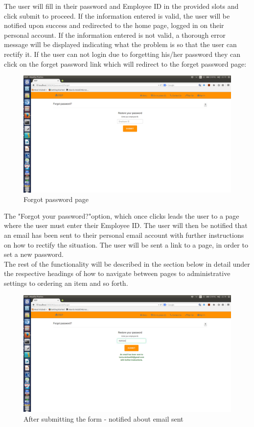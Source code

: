 \documentclass[a4paper,12pt]{report}
\begin{document}
The user will fill in their password and Employee ID in the provided slots and click submit to proceed. If the information entered is valid, the user will be notified upon success and redirected to the home page, logged in on their personal account. If the information entered is not valid, a thorough error message will be displayed indicating what the problem is so that the user can rectify it.
If the user can not login due to forgetting his/her password they can click on the forget password link which will redirect to the forget password page:
 
\begin{figure}[H]
  \centering
    \includegraphics[width=1.0\textwidth]{screenshots/ForgotPass.png}
    \caption{Forgot password page} 
\end{figure}

The "Forgot your password?"option, which once clicks leads the user to a page where the user must enter their Employee ID. The user will then be notified that an email has been sent to their personal email account with further instructions on how to rectify the situation. The user will be sent a link to a page, in order to set a new password.    \\

The rest of the functionality will be described in the section below in detail  under the respective headings of how to navigate between pages to administrative settings to ordering an item and so forth. 
 
\begin{figure}[H]
  \centering
    \includegraphics[width=1.0\textwidth]{screenshots/emailSentForPass.png}
    \caption{After submitting the form - notified about email sent} 
\end{figure}
\end{document}
